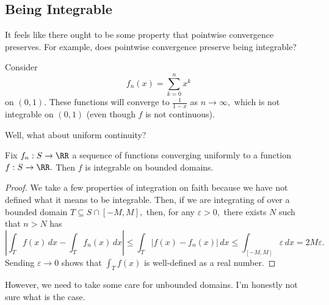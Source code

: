 \subsection{Being Integrable}
It feels like there ought to be some property that pointwise convergence preserves. For example, does pointwise convergence preserve being integrable?
\begin{example}
	Consider
	\[f_n(x)=\sum_{k=0}^nx^k\]
	on $(0,1).$ These functions will converge to $\frac1{1-x}$ as $n\to\infty,$ which is not integrable on $(0,1)$ (even though $f$ is not continuous).
\end{example}
Well, what about uniform continuity?
\begin{proposition}
	Fix $f_n:S\to\RR$ a sequence of functions converging uniformly to a function $f:S\to\RR.$ Then $f$ is integrable on bounded domains.
\end{proposition}
\begin{proof}
	We take a few properties of integration on faith because we have not defined what it means to be integrable. Then, if we are integrating of over a bounded domain $T\subseteq S\cap[-M,M],$ then, for any $\varepsilon>0,$ there exists $N$ such that $n>N$ has
	\[\left|\int_Tf(x)\,dx-\int_Tf_n(x)\,dx\right|\le\int_T|f(x)-f_n(x)|\,dx\le\int_{[-M,M]}\varepsilon\,dx=2M\varepsilon.\]
	Sending $\varepsilon\to0$ shows that $\int_Tf(x)$ is well-defined as a real number.
\end{proof}
However, we need to take some care for unbounded domains. I'm honestly not sure what is the case.


